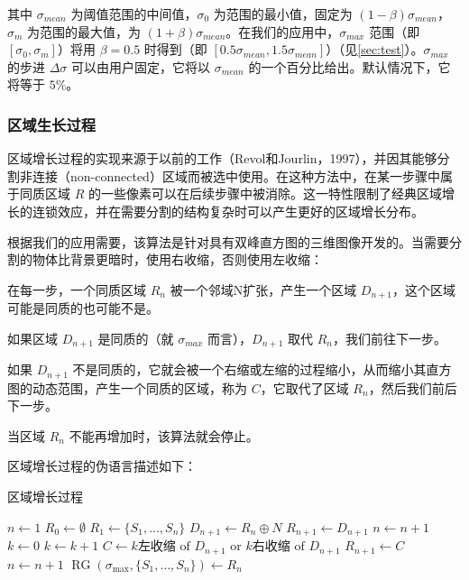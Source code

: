 其中 $\sigma_{mean}$ 为阈值范围的中间值，$\sigma_{0}$ 为范围的最小值，固定为 $(1-\beta) \sigma_{mean}$，$\sigma_{m}$ 为范围的最大值，为 $(1+\beta) \sigma_{mean}$。在我们的应用中，$\sigma_{max}$ 范围（即 $[\sigma_{0}, \sigma_{m}]$）将用 $\beta=0.5$ 时得到（即 $[0.5 \sigma_{mean}, 1.5 \sigma_{mean}]$）（见\cref{sec:test}）。$\sigma_{max}$ 的步进 $\Delta \sigma$ 可以由用户固定，它将以 $\sigma_{mean}$ 的一个百分比给出。默认情况下，它将等于 $5\%$。

\subsubsection{区域生长过程}

区域增长过程的实现来源于以前的工作（Revol和Jourlin，1997\cite{revol1997new}），并因其能够分割非连接（non-connected）区域而被选中使用。在这种方法中，在某一步骤中属于同质区域 $R$ 的一些像素可以在后续步骤中被消除。这一特性限制了经典区域增长的连锁效应，并在需要分割的结构复杂时可以产生更好的区域增长分布。

根据我们的应用需要，该算法是针对具有双峰直方图的三维图像开发的。当需要分割的物体比背景更暗时，使用右收缩，否则使用左收缩：

在每一步，一个同质区域 $R_{n}$ 被一个邻域N扩张，产生一个区域 $D_{n+1}$，这个区域可能是同质的也可能不是。

如果区域 $D_{n+1}$ 是同质的（就 $\sigma_{max}$ 而言），$D_{n+1}$ 取代 $R_{n}$，我们前往下一步。

如果 $D_{n+1}$ 不是同质的，它就会被一个右缩或左缩的过程缩小，从而缩小其直方图的动态范围，产生一个同质的区域，称为 $C$，它取代了区域 $R_{n}$，然后我们前后下一步。

当区域 $R_{n}$ 不能再增加时，该算法就会停止。

区域增长过程的伪语言描述如下：

\begin{algorithm}
    \caption{区域增长过程}\label{algo:region_growing}
    \begin{algorithmic}[1]
        \State $n \gets 1$
        \State $R_{0} \gets \emptyset$
        \State $R_{1} \gets \{S_{1}, \ldots, S_{n}\}$
            \State $D_{n+1} \gets R_{n} \oplus N$ 
                \State $R_{n+1} \gets D_{n+1}$
                \State $n \gets n+1$
            \Else
                \State $k \gets 0$
                    \State $k \gets k+1$
                    \State $C \gets k \text{左收缩 of } D_{n+1} \text{ or } k \text{右收缩 of } D_{n+1}$
                \EndWhile
                \State $R_{n+1} \gets C$
                \State $n \gets n+1$
            \EndIf
        \EndWhile
        \State $\operatorname{RG}(\sigma_{\max},\{S_{1}, \ldots, S_{n}\}) \gets R_{n}$
    \end{algorithmic}
\end{algorithm}

